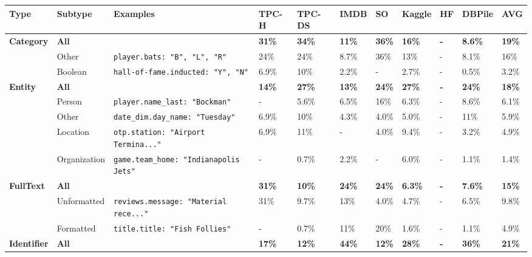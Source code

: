 \begin{small}
\begin{tabular}{lllllllllll}
\toprule
\small{\textbf{Type}} & \small{\textbf{Subtype}} & \small{\textbf{Examples}} & \small{\textbf{TPC-H}} & \small{\textbf{TPC-DS}} & \small{\textbf{IMDB}} & \small{\textbf{SO}} & \small{\textbf{Kaggle}} & \small{\textbf{HF}} & \small{\textbf{DBPile}} & \small{\textbf{AVG}} \\
\midrule
\addlinespace[0.6em] \textbf{Category} & \textbf{All} & \textbf{} & \textbf{31\%} & \textbf{34\%} & \textbf{11\%} & \textbf{36\%} & \textbf{16\%} & \textbf{-} & \textbf{8.6\%} & \textbf{19\%} \\
 & Other & \small\texttt{player.bats: "B", "L", "R"} & 24\% & 24\% & 8.7\% & 36\% & 13\% & - & 8.1\% & 16\% \\
 & Boolean & \small\texttt{hall-of-fame.inducted: "Y", "N"} & 6.9\% & 10\% & 2.2\% & - & 2.7\% & - & 0.5\% & 3.2\% \\
\addlinespace[0.6em] \textbf{Entity} & \textbf{All} & \textbf{} & \textbf{14\%} & \textbf{27\%} & \textbf{13\%} & \textbf{24\%} & \textbf{27\%} & \textbf{-} & \textbf{24\%} & \textbf{18\%} \\
 & Person & \small\texttt{player.name\_last: "Bockman"} & - & 5.6\% & 6.5\% & 16\% & 6.3\% & - & 8.6\% & 6.1\% \\
 & Other & \small\texttt{date\_dim.day\_name: "Tuesday"} & 6.9\% & 10\% & 4.3\% & 4.0\% & 5.0\% & - & 11\% & 5.9\% \\
 & Location & \small\texttt{otp.station: "Airport Termina..."} & 6.9\% & 11\% & - & 4.0\% & 9.4\% & - & 3.2\% & 4.9\% \\
 & Organization & \small\texttt{game.team\_home: "Indianapolis Jets"} & - & 0.7\% & 2.2\% & - & 6.0\% & - & 1.1\% & 1.4\% \\
\addlinespace[0.6em] \textbf{FullText} & \textbf{All} & \textbf{} & \textbf{31\%} & \textbf{10\%} & \textbf{24\%} & \textbf{24\%} & \textbf{6.3\%} & \textbf{-} & \textbf{7.6\%} & \textbf{15\%} \\
 & Unformatted & \small\texttt{reviews.message: "Material rece..."} & 31\% & 9.7\% & 13\% & 4.0\% & 4.7\% & - & 6.5\% & 9.8\% \\
 & Formatted & \small\texttt{title.title: "Fish Follies"} & - & 0.7\% & 11\% & 20\% & 1.6\% & - & 1.1\% & 4.9\% \\
\addlinespace[0.6em] \textbf{Identifier} & \textbf{All} & \textbf{} & \textbf{17\%} & \textbf{12\%} & \textbf{44\%} & \textbf{12\%} & \textbf{28\%} & \textbf{-} & \textbf{36\%} & \textbf{21\%} \\

\end{tabular}
\end{small}
